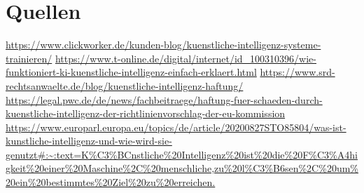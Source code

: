 \documentclass{article}
\begin{document}
 \section {Quellen}
 \url {https://www.clickworker.de/kunden-blog/kuenstliche-intelligenz-systeme-trainieren/}
 \url{https://www.t-online.de/digital/internet/id_100310396/wie-funktioniert-ki-kuenstliche-intelligenz-einfach-erklaert.html}
 \url {https://www.srd-rechtsanwaelte.de/blog/kuenstliche-intelligenz-haftung/}
 \url {https://legal.pwc.de/de/news/fachbeitraege/haftung-fuer-schaeden-durch-kuenstliche-intelligenz-der-richtlinienvorschlag-der-eu-kommission}
\url {https://www.europarl.europa.eu/topics/de/article/20200827STO85804/was-ist-kunstliche-intelligenz-und-wie-wird-sie-genutzt#:~:text=K%C3%BCnstliche%20Intelligenz%20ist%20die%20F%C3%A4higkeit%20einer%20Maschine%2C%20menschliche,zu%20l%C3%B6sen%2C%20um%20ein%20bestimmtes%20Ziel%20zu%20erreichen.}
\end{document}
